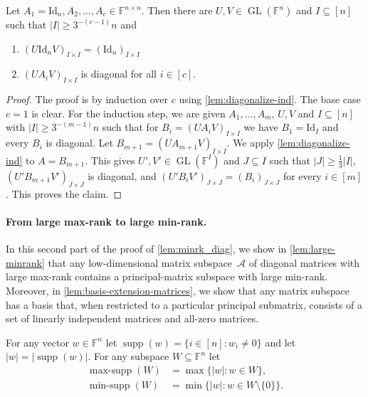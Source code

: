 \documentclass{daj}
\DeclareMathOperator{\supp}{supp}
\newcommand{\FF}{\mathbb{F}}
\DeclareMathOperator{\GL}{GL}
\DeclareMathOperator{\minsupp}{min-supp}
\DeclareMathOperator{\maxsupp}{max-supp}
\newcommand{\id}{\mathrm{Id}}
\begin{document}
\begin{lemma}\label{lem:diagonalize}
Let $A_1 = \id_n, A_2, \ldots, A_c \in \FF^{n \times n}$. Then there are $U,V \in \GL(\FF^n)$ and $I \subseteq [n]$ such that $|I| \geq 3^{-(c-1)} n$ and
\begin{enumerate}[\upshape (i)]
    \item $(U \id_n V)_{I\times I} = (\id_n)_{I\times I}$
    \item $(UA_i V)_{I \times I}$ is diagonal for all $i \in [c]$.
\end{enumerate}
\end{lemma}
\begin{proof}
    The proof is by induction over $c$ using \autoref{lem:diagonalize-ind}. 
    The base case $c = 1$ is clear.
    For the induction step, we are given $A_1, \ldots, A_m$, $U,V$ and $I \subseteq[n]$ with $|I| \geq 3^{-(m-1)}n$ such that for $B_i = (UA_i V)_{I \times I}$ we have $B_1 = \id_I$ and every $B_i$ is diagonal.
    Let $B_{m+1} = (U A_{m+1} V)_{I \times I}$. We apply \autoref{lem:diagonalize-ind} to $A = B_{m+1}$. This gives $U', V' \in \GL(\FF^I)$ and $J \subseteq I$ such that $|J| \geq \tfrac13 |I|$, $(U' B_{m+1} V')_{J \times J}$ is diagonal, and $(U' B_i V')_{J \times J} = (B_i)_{J \times J}$ for every $i \in [m]$. This proves the claim.
\end{proof}

\paragraph{From large max-rank to large min-rank.}
In this second part of the proof of \autoref{lem:minrk_diag}, we show in \autoref{lem:large-minrank} that any low-dimensional matrix subspace~$\mathcal A$ of diagonal matrices with large max-rank contains a principal-matrix subspace with large min-rank.
Moreover, in \autoref{lem:basis-extension-matrices}, we show that any matrix subspace has a basis that, when restricted to a particular principal submatrix, consists of a set of linearly independent matrices and all-zero matrices.

For any vector $w \in \FF^n$ let $\supp(w) = \{i \in [n]: w_i \neq 0\}$ and let $|w| = |\supp(w)|$. For any subspace $W \subseteq \FF^n$ let
\begin{align*}
\maxsupp(W) &= \max \{ |w| : w \in W\},\\
\minsupp(W) &= \min \{ |w| : w \in W \setminus \{0\}\}.
\end{align*}
\end{document}
